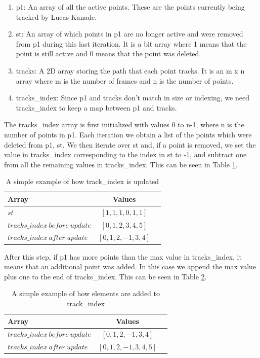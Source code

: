 \documentclass[12pt, twocolumn, conference]{IEEEtran}
\begin{document}
\begin{enumerate}
\item p1: An array of all the active points. These are the points currently being tracked by Lucas-Kanade.
\item st: An array of which points in p1 are no longer active and were removed from p1 during this last iteration. It is a bit array where 1 means that the point is still active and 0 means that the point was deleted.
\item tracks: A 2D array storing the path that each point tracks. It is an m x n array where m is the number of frames and n is the number of points.
\item tracks\_index: Since p1 and tracks don’t match in size or indexing, we need tracks\_index to keep a map between p1 and tracks.
\end{enumerate}

The tracks\_index array is first initialized with values 0 to n-1, where n is the number of points in p1. Each iteration we obtain a list of the points which were deleted from p1, st. We then iterate over st and, if a point is removed, we set the value in tracks\_index corresponding to the index in st to -1, and subtract one from all the remaining values in tracks\_index. This can be seen in Table \ref{table_index}.

\begin{table}[!t]
\caption{A simple example of how track\_index is updated}
\label{table_index}
\centering
\begin{tabular}{ | l | c | r | }
 \hline
 Array & Values\\
  \hline\hline                    
  $st$ & $[1, 1, 1, 0, 1, 1]$\\
  \hline
  $tracks\_index\ before\ update$ & $[0, 1, 2, 3, 4, 5]$ \\
  \hline
  $tracks\_index\ after\ update$ & $[0, 1, 2, -1, 3, 4]$ \\
  \hline  
\end{tabular}
\end{table}

After this step, if p1 has more points than the max value in tracks\_index, it means that an additional point was added. In this case we append the max value plus one to the end of tracks\_index. This can be seen in Table \ref{table_index_add}.

\begin{table}[!t]
\caption{A simple example of how elements are added to track\_index}
\label{table_index_add}
\centering
\begin{tabular}{ | l | c | r | }
 \hline
 Array & Values\\
  \hline\hline                     
  $tracks\_index\ before\ update$ & $[0, 1, 2, -1, 3, 4]$ \\
  \hline
  $tracks\_index\ after\ update$ & $[0, 1, 2, -1, 3, 4, 5]$ \\
  \hline  
\end{tabular}
\end{table}
\end{document}
